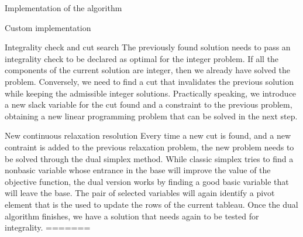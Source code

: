 \documentclass[9pt]{extarticle}
\begin{document}
\begin{section}{Implementation of the algorithm}
\begin{subsection}{Custom implementation}
            \begin{subsubsection}{Integrality check and cut search}
                The previously found solution needs to pass an integrality check to be declared as optimal for the integer problem.
                If all the components of the current solution are integer, then we already have solved the problem.
                Conversely, we need to find a cut that invalidates the previous solution while keeping the admissible integer solutions.
                Practically speaking, we introduce a new slack variable for the cut found and a constraint to the previous problem,
                obtaining a new linear programming problem that can be solved in the next step.
            \end{subsubsection}

            \begin{subsubsection}{New continuous relaxation resolution}
                Every time a new cut is found, and a new contraint is added to the previous relaxation problem, the new problem needs to be solved
                through the dual simplex method.
                While classic simplex tries to find a nonbasic variable whose entrance in the base will improve the value of the objective function,
                the dual version works by finding a good basic variable that will leave the base.
                The pair of selected variables will again identify a pivot element that is the used to update the rows of the current tableau.
                Once the dual algorithm finishes, we have a solution that needs again to be tested for integrality.
=======
        

\end{subsubsection}
\end{subsection}
\end{section}
\end{document}
